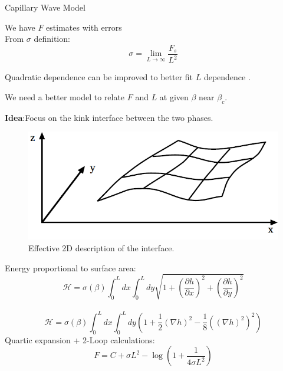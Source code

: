 \documentclass[12pt,handout]{beamer}
\begin{document}
\begin{frame}{Capillary Wave Model}
\begin{center}
We have $F$ estimates with errors\\
\vspace{10pt}
From $\sigma$ definition:
\[
	\sigma = \lim_{L \rightarrow \infty} \frac{F_s}{L^2}
\]

Quadratic dependence can be improved to better fit $L$ dependence .\\
\vspace{10pt}

We need a better model to relate $F$ and $L$ at given $\beta$ near $\beta_c$.
%
%
\end{center}
\end{frame}

\begin{frame}
\begin{center}
\vspace{5pt}
\textbf{Idea}:Focus on the kink interface between the two phases.

\begin{figure}[!htb]
\centering
\includegraphics[scale=0.4]{CWM.png}
\caption{\centering Effective 2D description of the interface.}
\end{figure}

\end{center}
\end{frame}

\begin{frame}

\begin{center}
Energy proportional to surface area:
\[
\mathcal H = \sigma\left(\beta \right) \int _0 ^{L} dx \int _0 ^{L} dy \sqrt{1 + \left(\frac{\partial h}{\partial x}\right)^2 + \left(\frac{\partial h}{\partial y}\right)^2}
\]\\
\[
	\mathcal H  = \sigma\left(\beta \right) \int _0 ^{L} dx \int _0 ^{L} dy \left( 1 + \frac{1}{2}\left(\nabla{h}\right) ^2 - \frac{1}{8}\left(\left(\nabla{h}\right) ^2\right) ^2 \right)
\]
Quartic expansion + 2-Loop calculations:
\[
F = C + \sigma L ^2 - \log\left( 1 + \frac{1}{4\sigma L^2}\right)
\]
\end{center}
\end{frame}
\end{document}
